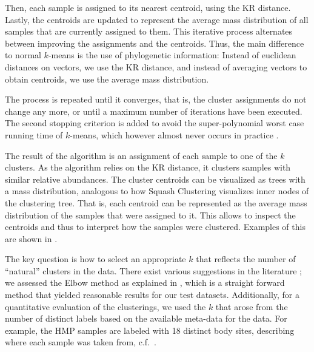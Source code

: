 Then, each sample is assigned to its nearest centroid, using the KR distance. %
Lastly, the centroids are updated to represent
the average mass distribution of all samples that are currently assigned to them.
This iterative process alternates between improving the assignments and the centroids.
Thus, the main difference to normal $k$-means is the use of phylogenetic information:
Instead of euclidean distances on vectors, we use the KR distance,
and instead of averaging vectors to obtain centroids, we use the average mass distribution.

The process is repeated until it converges,
that is, the cluster assignments do not change any more,
or until a maximum number of iterations have been executed.
The second stopping criterion is added to avoid the super-polynomial worst case running time of $k$-means,
which however almost never occurs in practice \cite{Bottou1995,Arthur2006}.

The result of the algorithm is an assignment of each sample to one of the $k$ clusters.
As the algorithm relies on the KR distance, it clusters samples with similar relative abundances.
The cluster centroids can be visualized as trees with a mass distribution,
analogous to how Squash Clustering visualizes inner nodes of the clustering tree.
That is, each centroid can be represented as the average mass distribution of the samples that were assigned to it.
This allows to inspect the centroids and thus to interpret how the samples were clustered.
Examples of this are shown in . %

The key question is how to select an appropriate $k$
that reflects the number of ``natural'' clusters in the data.
There exist various suggestions in the literature
\cite{Thorndike1953,Rousseeuw1987,Bischof1999,Pelleg2000,Tibshirani2001,Hamerly2004};
we assessed the Elbow method \cite{Thorndike1953} as explained in ,
which is a straight forward method that yielded reasonable results for our test datasets.
Additionally, for a quantitative evaluation of the clusterings,
we used the $k$ that arose from the number of distinct labels based on the available meta-data for the data.
For example, the \ac{HMP} samples are labeled with \num{18} distinct body sites,
describing where each sample was taken from, c.f.~.


